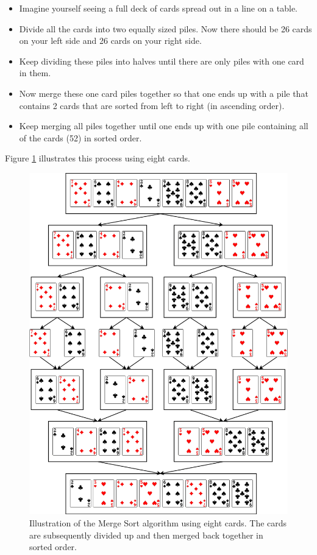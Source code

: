 \begin{itemize}
\item Imagine yourself seeing a full deck of cards spread out in a line on a table.
\item Divide all the cards into two equally sized piles. Now there should be 26 cards on your left side and 26 cards on your right side.
\item Keep dividing these piles into halves until there are only piles with one card in them. 
\item Now merge these one card piles together so that one ends up with a pile that contains 2 cards that are sorted from left to right (in ascending order).
\item Keep merging all piles together until one ends up with one pile containing all of the cards (52) in sorted order.

\end{itemize} 

Figure \ref{fig:mergesort} illustrates this process using eight cards.

\begin{figure}[h]
	\centering
	\includegraphics[width=0.9\linewidth]{chapters/media/mergesort4.png}
	\caption{Illustration of the Merge Sort algorithm using eight cards. The cards are subsequently divided up and then merged back together in sorted order.}
	\label{fig:mergesort}
\end{figure}

